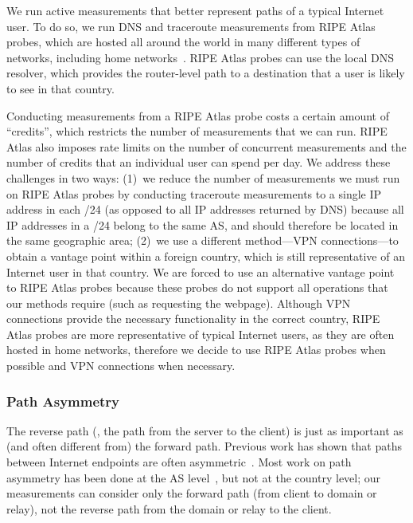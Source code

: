 We run active measurements that better represent paths of a typical Internet user. To do so, we run
DNS and traceroute measurements from RIPE Atlas probes, which are hosted
all around the world in many different types of networks, including home
networks~\cite{ripe_atlas}.  RIPE Atlas probes can use the local DNS
resolver, which provides the router-level path to a destination that a user is
 likely to see in that country.  

Conducting measurements from a RIPE Atlas probe costs a certain
amount of ``credits'', which restricts the number of measurements that we
can run.  RIPE Atlas also imposes rate limits on the number of
concurrent measurements and the number of credits that an individual
user can spend per day.  We address these challenges in two ways: (1)~we
reduce the number of measurements we must run on RIPE Atlas
probes by conducting traceroute measurements to a single IP address in
each /24 (as opposed to all IP addresses returned by DNS) because all IP
addresses in a /24 belong to the same AS, and should therefore be
located in the same geographic area; (2)~we use a different method---VPN
connections---to obtain a vantage point within a foreign country, which
is still representative of an Internet user in that country.  We are forced to 
use an alternative vantage point to RIPE Atlas probes because these probes 
do not support all operations that our methods require (such as requesting 
the webpage).  Although VPN connections provide the necessary functionality in 
the correct country, RIPE Atlas probes are more representative of typical 
Internet users, as they are often hosted in home networks, therefore we decide
 to use RIPE Atlas probes when possible and VPN connections when necessary.

\subsubsection{Path Asymmetry}
\label{path_sym}

The reverse path (\ie, the path from the server to the client) is just as important
as (and often different from) the
forward path.   Previous work has shown that paths between Internet endpoints
are often asymmetric~\cite{he2005routing}.  Most work on path asymmetry has
been done at the AS level~\cite{paxson1997end,gao2001inferring,he2005routing,he2004quantifying}, but not at the country level; our measurements can
consider only the forward path (from client to domain or relay), not the
reverse path from the domain or relay to the client.

